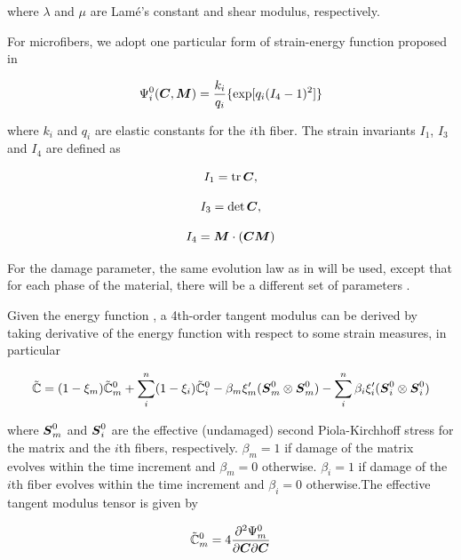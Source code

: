 \documentclass[12pt]{article}
\numberwithin{equation}{section}
\begin{document}
where $\lambda$ and $\mu$ are Lam\'{e}'s constant and shear modulus,
respectively.  

For microfibers, we adopt one particular form of strain-energy 
function proposed in \cite{Holzapfel.etal:2010}

\begin{equation}
  \Psi_i^0({\boldsymbol{C}}, {\boldsymbol{M}}) 
    = \frac{k_i}{q_i}
    \{ \exp[q_i(I_4 - 1)^2] \}
\end{equation}

where $k_i$ and $q_i$ are elastic constants for the $i$th fiber. 
The strain invariants $I_1$, $I_3$ and $I_4$ are defined as

\begin{equation}
  I_1 = \operatorname{\text{tr}} {\boldsymbol{C}}, 
\end{equation}

\begin{equation}
  I_3 = \det {\boldsymbol{C}},
\end{equation}

\begin{equation}
  I_4 = {\boldsymbol{M}} \cdot ({\boldsymbol{C}} {\boldsymbol{M}})
\end{equation}

For the damage parameter, the same evolution law as in 
 will be used, except that for each phase of the 
material, there will be a different set of parameters \cite{Chen.etal:2014}.

Given the energy function , a 4th-order
tangent modulus can be derived by taking derivative of the energy 
function with respect to some strain measures, in particular

\begin{equation}\label{eq:aniso_tangent}
  \tilde{\mathbb{C}} 
   = (1-\xi_m)\tilde{\mathbb{C}}_m^0 
   + \sum_i^n (1-\xi_i) \tilde{\mathbb{C}}_i^0
   -\beta_m \xi_m' ({\boldsymbol{S}}_m^0 \otimes {\boldsymbol{S}}_m^0 )
   - \sum_i^n \beta_i \xi_i' ({\boldsymbol{S}}_i^0 \otimes {\boldsymbol{S}}_i^0 )
\end{equation}

where ${\boldsymbol{S}}_m^0$ and ${\boldsymbol{S}}_i^0$ are the effective (undamaged) second Piola-Kirchhoff stress for the matrix and the $i$th fibers, respectively. $\beta_m = 1$ if damage of the matrix evolves within the time increment and $\beta_m=0$ otherwise. $\beta_i = 1$ if damage of the $i$th fiber evolves within the time increment and $\beta_i=0$ otherwise.The effective tangent modulus tensor is given by

\begin{equation}\label{eq:aniso_tangent1}
  \tilde{\mathbb{C}}_m^0 = 
    4\frac{\partial ^2 \Psi_m^0}{\partial{\boldsymbol{C}} \partial{\boldsymbol{C}}}
\end{equation}
\end{document}
